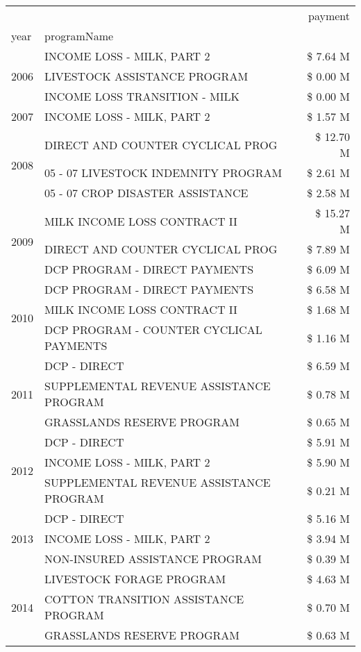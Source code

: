 \begin{tabular}{llr}
\toprule
 &  & payment \\
year & programName &  \\
\midrule
\multirow[t]{3}{*}{2006} & INCOME LOSS - MILK, PART 2 & \$ 7.64 M \\
 & LIVESTOCK ASSISTANCE PROGRAM & \$ 0.00 M \\
 & INCOME LOSS TRANSITION - MILK & \$ 0.00 M \\
\cline{1-3}
2007 & INCOME LOSS - MILK, PART 2 & \$ 1.57 M \\
\cline{1-3}
\multirow[t]{3}{*}{2008} & DIRECT AND COUNTER CYCLICAL PROG & \$ 12.70 M \\
 & 05 - 07 LIVESTOCK INDEMNITY PROGRAM & \$ 2.61 M \\
 & 05 - 07 CROP DISASTER ASSISTANCE & \$ 2.58 M \\
\cline{1-3}
\multirow[t]{3}{*}{2009} & MILK INCOME LOSS CONTRACT II & \$ 15.27 M \\
 & DIRECT AND COUNTER CYCLICAL PROG & \$ 7.89 M \\
 & DCP PROGRAM - DIRECT PAYMENTS & \$ 6.09 M \\
\cline{1-3}
\multirow[t]{3}{*}{2010} & DCP PROGRAM - DIRECT PAYMENTS & \$ 6.58 M \\
 & MILK INCOME LOSS CONTRACT II & \$ 1.68 M \\
 & DCP PROGRAM - COUNTER CYCLICAL PAYMENTS & \$ 1.16 M \\
\cline{1-3}
\multirow[t]{3}{*}{2011} & DCP - DIRECT & \$ 6.59 M \\
 & SUPPLEMENTAL REVENUE ASSISTANCE PROGRAM & \$ 0.78 M \\
 & GRASSLANDS RESERVE PROGRAM & \$ 0.65 M \\
\cline{1-3}
\multirow[t]{3}{*}{2012} & DCP - DIRECT & \$ 5.91 M \\
 & INCOME LOSS - MILK, PART 2 & \$ 5.90 M \\
 & SUPPLEMENTAL REVENUE ASSISTANCE PROGRAM & \$ 0.21 M \\
\cline{1-3}
\multirow[t]{3}{*}{2013} & DCP - DIRECT & \$ 5.16 M \\
 & INCOME LOSS - MILK, PART 2 & \$ 3.94 M \\
 & NON-INSURED ASSISTANCE PROGRAM & \$ 0.39 M \\
\cline{1-3}
\multirow[t]{3}{*}{2014} & LIVESTOCK FORAGE PROGRAM & \$ 4.63 M \\
 & COTTON TRANSITION ASSISTANCE PROGRAM & \$ 0.70 M \\
 & GRASSLANDS RESERVE PROGRAM & \$ 0.63 M \\

\end{tabular}
